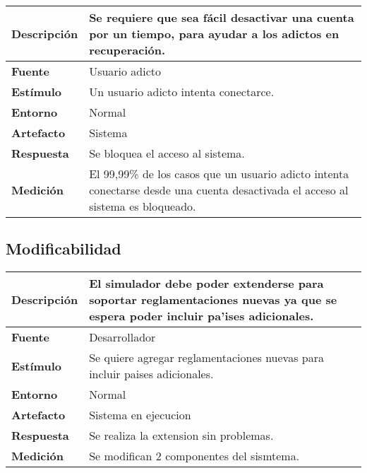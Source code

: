 \begin{center}
  \begin{tabular}{| l | p{10cm} | }
    \hline
  \textbf{Descripción} & Se requiere que sea fácil desactivar una cuenta por un tiempo, para ayudar a los adictos en recuperación.\\  \hline
  \textbf{Fuente} & Usuario adicto\\  \hline
  \textbf{Estímulo} & Un usuario adicto intenta conectarce.\\  \hline
  \textbf{Entorno} & Normal\\  \hline
  \textbf{Artefacto} & Sistema\\  \hline
  \textbf{Respuesta} & Se bloquea el acceso al sistema.\\  \hline
  \textbf{Medición} & El 99,99\% de los casos que un usuario adicto intenta conectarse desde una cuenta desactivada el acceso al sistema es bloqueado.\\  \hline
  \end{tabular}
\end{center} 





\subsection{Modificabilidad}

\begin{center}
  \begin{tabular}{| l | p{10cm} | }
    \hline
  \textbf{Descripción} & El simulador debe poder extenderse para soportar reglamentaciones nuevas ya que se espera poder incluir pa'ises adicionales.\\  \hline
  \textbf{Fuente} & Desarrollador\\  \hline
  \textbf{Estímulo} & Se quiere agregar reglamentaciones nuevas para incluir paises adicionales.\\  \hline
  \textbf{Entorno} & Normal\\  \hline
  \textbf{Artefacto} & Sistema en ejecucion\\  \hline
  \textbf{Respuesta} & Se realiza la extension sin problemas.\\  \hline
  \textbf{Medición} & Se modifican 2 componentes del sismtema.\\  \hline
  \end{tabular}
\end{center} 

